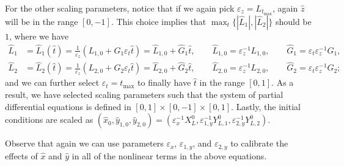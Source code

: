 \documentclass[11pt]{article}
\numberwithin{equation}{section}
\begin{document}
For the other scaling parameters, notice that if we again pick \( \varepsilon_z = L_{t_{\max}}\), again \(\hat z \) will be in the range \( [0,-1]\). 
This choice implies that \( \max_t\{|\hat{L}_1|,|\hat{L}_2|\}\) should be \(1\), where we have
\begin{align}
    \hat{L}_1 &= \hat{L}_1(\hat t) = \frac{1}{\varepsilon_z} ( L_{1,0} + G_1 \varepsilon_t \hat t )
    = \hat{L}_{1,0} + \hat{G}_1 \hat t,
    \qquad 
    \hat{L}_{1,0} = \varepsilon^{-1}_z L_{1,0},
    \qquad
    \hat{G}_1 = \varepsilon_t \varepsilon_z^{-1} G_1,
    \\
    \hat{L}_2 &= \hat{L}_2(\hat t) = \frac{1}{\varepsilon_z} ( L_{2,0} + G_2 \varepsilon_t \hat t )
    = \hat{L}_{2,0} + \hat{G}_2 \hat t,
    \qquad 
    \hat{L}_{2,0} = \varepsilon^{-1}_z L_{2,0},
    \qquad
    \hat{G}_2 = \varepsilon_t \varepsilon_z^{-1} G_2;
\end{align}
and we can further select \( \varepsilon_t = t_{\max}\) to finally have \( \hat t\) in the range \( [0,1]\). As a result, we have selected scaling parameters such that the system of partial differential equations is defined in \([0,1]\times [0,-1] \times [0,1]\).
%
Lastly, the initial conditions are scaled as \( (\hat{x}_0,\hat{y}_{1,0},\hat{y}_{2,0} ) = (\varepsilon_x^{-1} X^0_L, \varepsilon_{1,y}^{-1} Y^0_{L,1}, \varepsilon_{2,y}^{-1} Y^0_{L,2}) \). 


Observe that again we can use parameters \(\varepsilon_x\), \(\varepsilon_{1,y}\), and \(\varepsilon_{2,y}\) to calibrate the effects of \( \hat{x}\) and \(\hat{y}\) in all of the nonlinear terms in the above equations.
\end{document}
